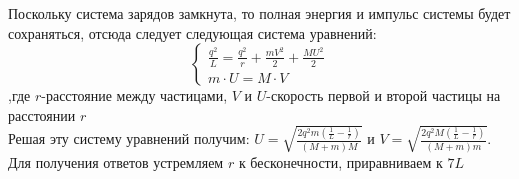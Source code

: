 \begin{sol}
Поскольку система зарядов замкнута, то полная энергия и импульс системы будет сохраняться, отсюда следует следующая система уравнений:
\begin{equation*}
\begin{cases}
\frac{q^2}{L}=\frac{q^2}{r}+\frac{m V^2}{2}+\frac{M U^2}{2} \\ 
m \cdot U=M \cdot V
\end{cases}
\end{equation*}
,где $r$-расстояние между частицами, $V$ и $U$-скорость первой и второй частицы на расстоянии $r$ \\
Решая эту систему уравнений получим: $U=\sqrt{\frac{2 q^2 m (\frac{1}{L}-\frac{1}{r})}{(M+m) M}}$ и $V=\sqrt{\frac{2 q^2 M (\frac{1}{L}-\frac{1}{r})}{(M+m)m}}$. Для получения ответов устремляем $r$ к бесконечности, приравниваем к $7L$
\end{sol}